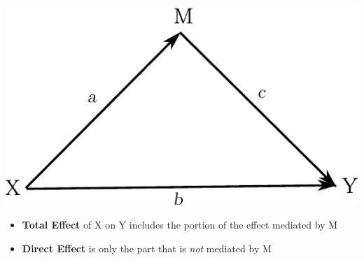 \documentclass[xcolor=dvipsnames]{beamer}
\begin{document}
\begin{frame}{}
\includegraphics{arrow_diag_2.pdf}
\begin{itemize}
	\item \textbf{Total Effect} of X on Y includes the portion of the effect
	mediated by M
	\item \textbf{Direct Effect} is only the part that is \textit{not} mediated
	by M
\end{itemize} 
\end{frame}
\end{document}
